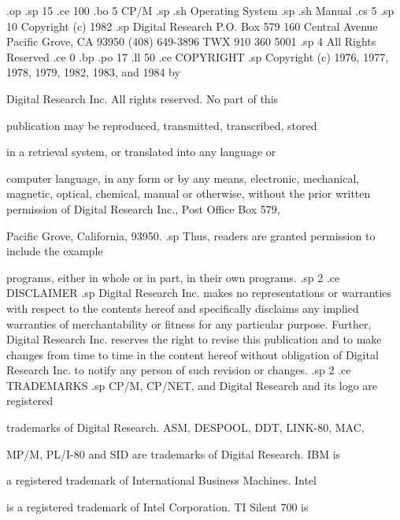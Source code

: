 .op
.sp 15
.ce 100
.bo 5
CP/M
.sp
.sh
Operating System
.sp
.sh
Manual
.cs 5
.sp 10
Copyright (c) 1982
.sp
Digital Research
P.O. Box 579
160 Central Avenue
Pacific Grove, CA 93950
(408) 649-3896
TWX 910 360 5001
.sp 4
All Rights Reserved
.ce 0
.bp
.po 17
.ll 50
.ce
COPYRIGHT
.sp
Copyright (c) 1976, 1977, 1978, 1979, 1982, 1983, and 1984 by 

Digital Research Inc.  All rights reserved.  No part of this 

publication may be reproduced, transmitted, transcribed, stored 

in a retrieval system, or translated into any language or 

computer language, in any form or by any means, electronic, mechanical,
magnetic, optical, chemical, manual or otherwise, without the prior
written permission of Digital Research Inc., Post Office Box 579, 

Pacific Grove, California, 93950.
.sp
Thus, readers are granted permission to include the example 

programs, either in whole or in part, in their own programs.
.sp 2
.ce
DISCLAIMER
.sp
Digital Research Inc. makes no representations or warranties with
respect to the contents hereof and specifically disclaims
any implied warranties of merchantability or fitness for
any particular purpose.  Further, Digital Research Inc. reserves the
right to revise this publication and to make changes from
time to time in the content hereof without obligation of
Digital Research Inc. to notify any person of such revision or
changes.
.sp 2
.ce
TRADEMARKS
.sp
CP/M, CP/NET, and Digital Research and its logo are registered 

trademarks of Digital Research.  ASM, DESPOOL, DDT, LINK-80, MAC, 

MP/M, PL/I-80 and SID are trademarks of Digital Research.  IBM is 

a registered trademark of International Business Machines.  Intel 

is a registered trademark of Intel Corporation.  TI Silent 700 is 

